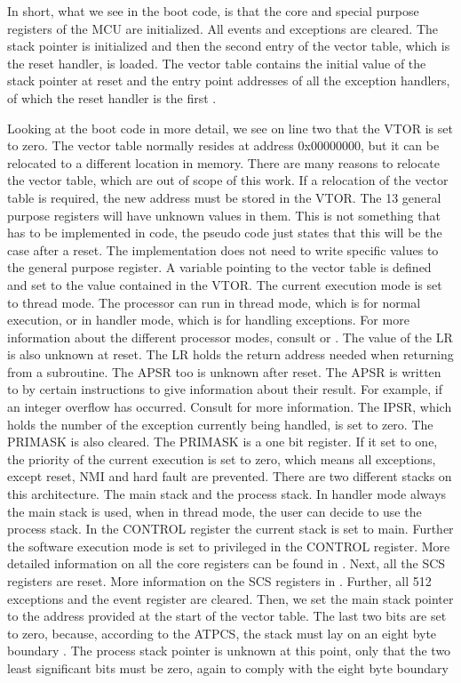 \documentclass[a4paper,12pt]{article}
\begin{document}
In short, what we see in the boot code, is that the core and special purpose registers of the \ac{MCU} are initialized. All events and exceptions are cleared. The stack pointer is initialized and then the second entry of the vector table, which is the reset handler, is loaded. The vector table contains the initial value of the stack pointer at reset and the entry point addresses of all the exception handlers, of which the reset handler is the first \cite{ARMv6-MRefManual}. 
\par Looking at the boot code in more detail, we see on line two that the \ac{VTOR} is set to zero. The vector table normally resides at address 0x00000000, but it can be relocated to a different location in memory. There are many reasons to relocate the vector table, which are out of scope of this work. If a relocation of the vector table is required, the new address must be stored in the \ac{VTOR}. The 13 general purpose registers will have unknown values in them. This is not something that has to be implemented in code, the pseudo code just states that this will be the case after a reset. The implementation does not need to write specific values to the general purpose register. A variable pointing to the vector table is defined and set to the value contained in the \ac{VTOR}. The current execution mode is set to thread mode. The processor can run in thread mode, which is for normal execution, or in handler mode, which is for handling exceptions. For more information about the different processor modes, consult \cite{ARMv6-MRefManual} or \cite{ARMv7-MRefManual}. The value of the \ac{LR} is also unknown at reset. The \ac{LR} holds the return address needed when returning from a subroutine. The \ac{APSR} too is unknown after reset. The \ac{APSR} is written to by certain instructions to give information about their result. For example, if an integer overflow has occurred. Consult \cite{ARMv6-MRefManual} for more information. The \ac{IPSR}, which holds the number of the exception currently being handled, is set to zero. The \ac{PRIMASK} is also cleared. The \ac{PRIMASK} is a one bit register. If it set to one, the priority of the current execution is set to zero, which means all exceptions, except reset, \ac{NMI} and hard fault are prevented. There are two different stacks on this architecture. The main stack and the process stack. In handler mode always the main stack is used, when in thread mode, the user can decide to use the process stack. In the CONTROL register the current stack is set to main. Further the software execution mode is set to privileged in the CONTROL register. More detailed information on all the core registers can be found in \cite{ArmDevGuideCoreRegisters}. Next, all the \ac{SCS} registers are reset. More information on the \ac{SCS} registers in \cite{ArmDevGuideSCSRegs}. Further, all 512 exceptions and the event register are cleared. Then, we set the main stack pointer to the address provided at the start of the vector table. The last two bits are set to zero, because, according to the \ac{ATPCS}, the stack must lay on an eight byte boundary \cite{ArmDevGuideAlignment}. The process stack pointer is unknown at this point, only that the two least significant bits must be zero, again to comply with the eight byte boundary 
\end{document}
